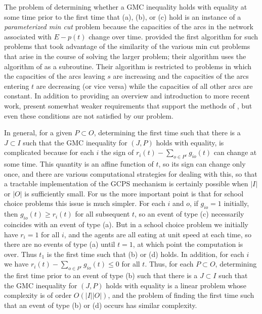 \documentclass[12pt]{article}
\theoremstyle{definition}
\begin{document}
The problem of determining whether a GMC inequality holds with equality at some time prior to the first time that (a), (b), or (c) hold is an instance of a \emph{parameterized min cut} problem because the capacities of the arcs in the network associated with $E - p(t)$ change over time.  \cite{GaGrTa89} provided the first algorithm for such problems that took advantage of the similarity of the various min cut problems that arise in the course of solving the larger problem; their algorithm uses the algorithm of \cite{GoTa88} as a subroutine.  Their algorithm is restricted to problems in which the capacities of the arcs leaving $s$ are increasing  and the capacities of the arcs entering $t$ are decreasing (or vice versa) while the capacities of all other arcs are constant.  In addition to providing an overview and introduction to more recent work, \cite{GrMcQuTa12} present somewhat weaker requirements that support the methods of \cite{GaGrTa89}, but even these conditions are not satisfied by our problem.

In general, for a given $P \subset O$, determining the first time such that there is a $J \subset I$ such that the GMC inequality for $(J,P)$ holds with equality, is complicated because for each $i$ the sign of $r_i(t) - \sum_{o \in P^c} g_{io}(t)$ can change at some time.  This quantity is an affine function of $t$, so its sign can change only once, and there are various computational strategies for dealing with this, so that a tractable implementation of the GCPS mechanism is certainly possible when $|I|$ or $|O|$ is sufficiently small.  For us the more important point is that for school choice problems this issue is much simpler.  For each $i$ and $o$, if $g_{io} = 1$ initially, then $g_{io}(t) \ge r_i(t)$ for all subsequent $t$, so an event of type (c) necessarily coincides with an event of type (a).  But in a school choice problem we initially have $r_i = 1$ for all $i$, and the agents are all eating at unit speed at each time, so there are no events of type (a) until $t = 1$, at which point the computation is over.  
Thus $t_1$ is the first time such that (b) or (d) holds.  In addition, for each $i$ we have $r_i(t) - \sum_{o \in P^c} g_{io}(t) \le 0$ for all $t$.
Thus, for each $P \subset O$, determining the first time prior to an event of type (b) such that there is a $J \subset I$ such that the GMC inequality for $(J,P)$ holds with equality is a linear problem whose complexity is of order $O(|I||O|)$, and the problem of finding the first time such that an event of type (b) or (d) occurs has similar complexity.
\end{document}
